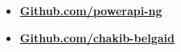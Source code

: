 \documentclass[10pt,a4paper,ragged2e,withhyper]{altacv}
\begin{document}
\begin{paracol}{2}
  \switchcolumn



  \medskip












  \begin{itemize}
    \item   \textbf{\color{accent}\href{https://github.com/powerapi-ng}
            {Github.com/powerapi-ng}}
    \item \textbf{\color{accent}\href{https://github.com/chakib-belgaid}
            {Github.com/chakib-belgaid}}
  \end{itemize}


\end{paracol}
\end{document}
